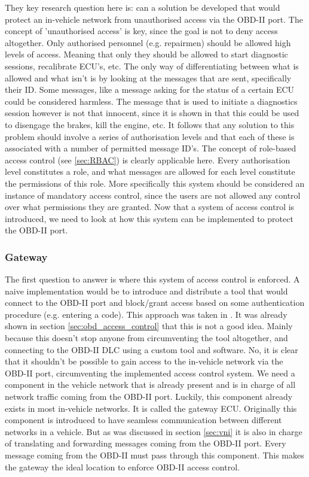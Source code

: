 \documentclass[11pt]{article}
\begin{document}
They key research question here is: can a solution be developed that would protect an in-vehicle network from unauthorised access via the OBD-II port. The concept of 'unauthorised access' is key, since the goal is not to deny access altogether. Only authorised personnel (e.g. repairmen) should be allowed high levels of access. Meaning that only they should be allowed to start diagnostic sessions, recalibrate ECU's, etc. The only way of differentiating between what is allowed and what isn't is by looking at the messages that are sent, specifically their ID. Some messages, like a message asking for the status of a certain ECU could be considered harmless. The message that is used to initiate a diagnostics session however is not that innocent, since it is shown in \cite{MillerC} that this could be used to disengage the brakes, kill the engine, etc. It follows that any solution to this problem should involve a series of authorisation levels and that each of these is associated with a number of permitted message ID's. The concept of role-based access control (see \ref{sec:RBAC}) is clearly applicable here. Every authorisation level constitutes a role, and what messages are allowed for each level constitute the permissions of this role. More specifically this system should be considered an instance of mandatory access control, since the users are not allowed any control over what permissions they are granted. Now that a system of access control is introduced, we need to look at how this system can be implemented to protect the OBD-II port.

\subsubsection{Gateway} 
\label{sec:gateway}

The first question to answer is where this system of access control is enforced. A naive implementation would be to introduce and distribute a tool that would connect to the OBD-II port and block/grant access based on some authentication procedure (e.g. entering a code). This approach was taken in \cite{Yadav16}. It was already shown in section \ref{sec:obd_access_control} that this is not a good idea. Mainly because this doesn't stop anyone from circumventing the tool altogether, and connecting to the OBD-II DLC using a custom tool and software. No, it is clear that it shouldn't be possible to gain access to the in-vehicle network via the OBD-II port, circumventing the implemented access control system. We need a component in the vehicle network that is already present and is in charge of all network traffic coming from the OBD-II port. Luckily, this component already exists in most in-vehicle networks. It is called the gateway ECU. Originally this component is introduced to have seamless communication between different networks in a vehicle. But as was discussed in section \ref{sec:vni} it is also in charge of translating and forwarding messages coming from the OBD-II port. Every message coming from the OBD-II must pass through this component. This makes the gateway the ideal location to enforce OBD-II access control. 
\end{document}
